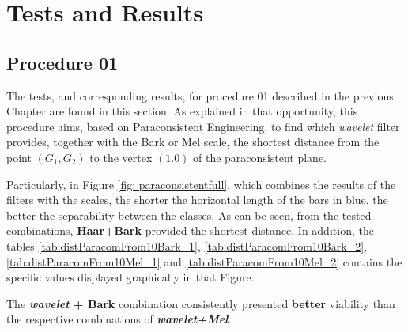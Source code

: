 \section{Tests and Results} \label{ea}
\subsection{Procedure 01}
\label{chap:testsResults:sec:Experimento01}
\par The tests, and corresponding results, for procedure 01 described in the previous Chapter are found in this section. As explained in that opportunity, this procedure aims, based on Paraconsistent Engineering, to find which \textit{wavelet} filter provides, together with the Bark or Mel scale, the shortest distance from the point $(G_1,G_2)$ to the vertex $(1.0)$ of the paraconsistent plane.

\par Particularly, in Figure \ref{fig: paraconsistentfull}, which combines the results of the filters with the scales, the shorter the horizontal length of the bars in blue, the better the separability between the classes. As can be seen, from the tested combinations, \textbf{Haar+Bark} provided the shortest distance. In addition, the tables \ref{tab:distParacomFrom10Bark_1}, \ref{tab:distParacomFrom10Bark_2}, \ref{tab:distParacomFrom10Mel_1} and \ref{tab:distParacomFrom10Mel_2} contains the specific values displayed graphically in that Figure.

\par The \textbf{\textit{wavelet} + Bark} combination consistently presented \textbf{better} viability than the respective combinations of \textbf{\textit{wavelet+Mel}}.\\



